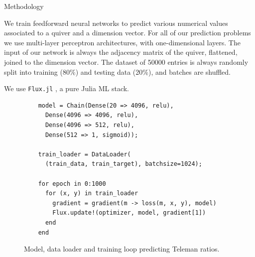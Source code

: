 \documentclass[final,20pt]{beamer}
\newlength{\colwidth}
\begin{document}
\begin{frame}[t, fragile]
\begin{columns}[t]
\begin{column}{\colwidth}
  \begin{block}{Methodology}

    We train feedforward neural networks to predict various numerical values
    associated to a quiver and a dimension vector.
    For all of our prediction problems we use multi-layer perceptron architectures,
    with one-dimensional layers.
    The input of our network is always the adjacency matrix of the quiver, flattened,
    joined to the dimension vector.
    The dataset of 50000 entries is always randomly split
    into training (80\%) and testing data (20\%),
    and batches are shuffled.

    We use {\tt{Flux.jl}} \cite{flux.jl,innes:2018}, a pure Julia ML stack.

    \begin{figure}
    \begin{verbatim}
    model = Chain(Dense(20 => 4096, relu),
      Dense(4096 => 4096, relu),
      Dense(4096 => 512, relu),
      Dense(512 => 1, sigmoid));

    train_loader = DataLoader(
      (train_data, train_target), batchsize=1024);

    for epoch in 0:1000
      for (x, y) in train_loader
        gradient = gradient(m -> loss(m, x, y), model)
        Flux.update!(optimizer, model, gradient[1])
      end
    end
    \end{verbatim}
    \caption{Model, data loader and training loop predicting Teleman ratios.}
    \end{figure}





\end{block}
\end{column}
\end{columns}
\end{frame}
\end{document}
